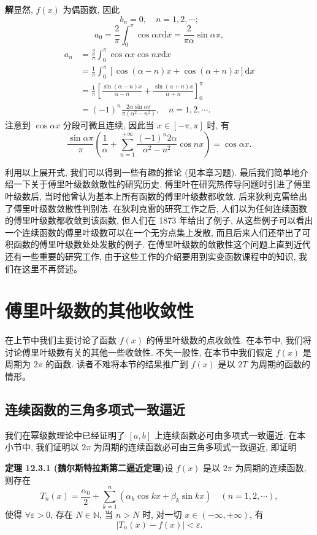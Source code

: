 \documentclass[UTF8, 12pt, fontset=fandol, oneside]{ctexart}
\begin{document}
\noindent\textbf{解}\quad 显然, $f(x)$ 为偶函数, 因此
\[
  b_n=0,\quad n=1,2,\cdots;
\]
\[
  a_0=\frac2\pi\int_0^\pi\cos\alpha x\mathrm dx=\frac{2}{\pi\alpha}\sin\alpha\pi,
\]
\[
\begin{aligned}
  a_n
  &=\frac2\pi\int_0^\pi\cos\alpha x\cos nx\mathrm dx\\
  &=\frac1\pi\int_0^\pi[\cos(\alpha-n)x+\cos(\alpha+n)x]\mathrm dx\\
  &=\frac1\pi\left[
    \frac{\sin(\alpha-n)x}{\alpha-n}
    +\frac{\sin(\alpha+n)x}{\alpha+n}
  \right]_0^\pi\\
  &=(-1)^n\frac{2\alpha\sin\alpha\pi}{\pi(\alpha^2-n^2)},\quad n=1,2,\cdots.
\end{aligned}
\]
注意到 $\cos\alpha x$ 分段可微且连续, 因此当 $x\in[-\pi,\pi]$ 时, 有
\[
  \frac{\sin\alpha\pi}{\pi}\left(
    \frac1\alpha+\sum_{n=1}^{+\infty}\frac{(-1)^n2\alpha}{\alpha^2-n^2}\cos nx
  \right)=\cos\alpha x.
\]

利用以上展开式, 我们可以得到一些有趣的推论 (见本章习题). 最后我们简单地介绍一下关于傅里叶级数敛散性的研究历史. 傅里叶在研究热传导问题时引进了傅里叶级数后, 当时他曾认为基本上所有函数的傅里叶级数都收敛. 后来狄利克雷给出了傅里叶级数敛散性判别法. 在狄利克雷的研究工作之后, 人们以为任何连续函数的傅里叶级数都收敛到该函数, 但人们在 1873 年给出了例子, 从这些例子可以看出一个连续函数的傅里叶级数可以在一个无穷点集上发散, 而且后来人们还举出了可积函数的傅里叶级数处处发散的例子. 在傅里叶级数的敛散性这个问题上直到近代还有一些重要的研究工作, 由于这些工作的介绍要用到实变函数课程中的知识, 我们在这里不再赘述。

\section{傅里叶级数的其他收敛性}

在上节中我们主要讨论了函数 $f(x)$ 的傅里叶级数的点收敛性. 在本节中, 我们将讨论傅里叶级数有关的其他一些收敛性. 不失一般性, 在本节中我们假定 $f(x)$ 是周期为 $2\pi$ 的函数. 读者不难将本节的结果推广到 $f(x)$ 是以 $2T$ 为周期的函数的情形。

\subsection{连续函数的三角多项式一致逼近}

我们在幂级数理论中已经证明了 $[a,b]$ 上连续函数必可由多项式一致逼近. 在本小节中, 我们证明以 $2\pi$ 为周期的连续函数必可由三角多项式一致逼近, 即证明

\noindent\textbf{定理 12.3.1 (魏尔斯特拉斯第二逼近定理)}\quad 设 $f(x)$ 是以 $2\pi$ 为周期的连续函数, 则存在
\[
  T_n(x)=\frac{\alpha_0}{2}+\sum_{k=1}^n(\alpha_k\cos kx+\beta_k\sin kx)\quad(n=1,2,\cdots),
\]
使得 $\forall\varepsilon>0$, 存在 $N\in\mathbb N$, 当 $n>N$ 时, 对一切 $x\in(-\infty,+\infty)$, 有
\[
  |T_n(x)-f(x)|<\varepsilon.
\]
\end{document}
